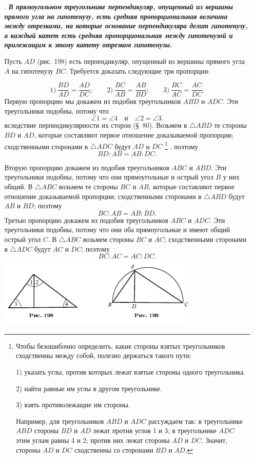 \documentclass[oneside]{book}
\begin{document}
.
\textbf{\emph{В прямоугольном треугольнике перпендикуляр, опущенный из вершины прямого угла на гипотенузу, есть средняя пропорциональная величина между отрезками, на которые основание перпендикуляра делит гипотенузу, а каждый катет есть средняя пропорциональная между гипотенузой и прилежащим к этому катету отрезком гипотенузы.}}

Пусть $AD$ (рис. 198) есть перпендикуляр, опущенный из вершины прямого угла $A$ на гипотенузу $BC$.
Требуется доказать следующие три пропорции:

\[1)\ \frac{BD}{AD}=\frac{AD}{DC};
\qquad
2)\ \frac{BC}{AB}=\frac{AB}{BD};
\qquad
3)\ \frac{BC}{AC}=\frac{AC}{DC}.
\]
Первую пропорцию мы докажем из подобия треугольников $ABD$ и $ADC$.
Эти треугольники подобны, потому что
\[\angle 1 = \angle 4\quad \text{и} \quad\angle 2 = \angle 3.\]
вследствие перпендикулярности их сторон (§~80).
Возьмем в $\triangle ABD$ те стороны $BD$ и $AD$, которые составляют первое отношение доказываемой пропорции;
сходственными сторонами в $\triangle ADC$ будут $AD$ и $DC$%
\footnote{Чтобы безошибочно определить, какие стороны взятых треугольников сходственны между собой, полезно держаться такого пути:

1) указать углы, против которых лежат взятые стороны одного треугольника.

2) найти равные им углы в другом треугольнике.

3) взять противолежащие им стороны.

Например, для треугольников $ABD$ и $ADC$ рассуждаем так:
в треугольнике $ABD$ стороны $BD$ и $AD$ лежат против углов 1 и 3;
в треугольнике $ADC$ этим углам равны 4 и 2;
против них лежат стороны $AD$ и $DC$.
Значит, стороны $AD$ и $DC$ сходственны со сторонами $BD$ и $AD$.
}%
, поэтому
\[BD:AB=AB:DC.\]

Вторую пропорцию докажем из подобия треугольников $ABC$ и $ABD$.
Эти треугольники подобны, потому что они прямоугольные и острый угол $B$ у них общий.
В $\triangle ABC$ возьмем те стороны $BC$ и $AB$, которые составляют первое отношение доказываемой пропорции;
сходственными сторонами в $\triangle ABD$ будут $AB$ и $BD$;
поэтому
\[BC:AB=AB:BD.\]
Третью пропорцию докажем из подобия треугольников $ABC$ и $ADC$.
Эти треугольники подобны, потому что они оба прямоугольные и имеют общий острый угол $C$.
В $\triangle ABC$ возьмем стороны $BC$ и $AC$;
сходственными сторонами в $\triangle ADC$ будут $AC$ и $DC$;
поэтому
\[BC:AC = AC:DC.\]
\includegraphics{pics/ris-198-199}
\end{document}
